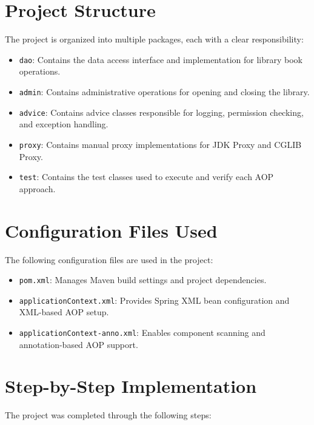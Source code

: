 \documentclass[12pt,a4paper]{article}
\begin{document}
\section*{Project Structure}
The project is organized into multiple packages, each with a clear responsibility:
\begin{itemize}
    \item \texttt{dao}: Contains the data access interface and implementation for library book operations.
    \item \texttt{admin}: Contains administrative operations for opening and closing the library.
    \item \texttt{advice}: Contains advice classes responsible for logging, permission checking, and exception handling.
    \item \texttt{proxy}: Contains manual proxy implementations for JDK Proxy and CGLIB Proxy.
    \item \texttt{test}: Contains the test classes used to execute and verify each AOP approach.
\end{itemize}

\section*{Configuration Files Used}
The following configuration files are used in the project:
\begin{itemize}
    \item \texttt{pom.xml}: Manages Maven build settings and project dependencies.
    \item \texttt{applicationContext.xml}: Provides Spring XML bean configuration and XML-based AOP setup.
    \item \texttt{applicationContext-anno.xml}: Enables component scanning and annotation-based AOP support.
\end{itemize}

\section*{Step-by-Step Implementation}
The project was completed through the following steps:
\end{document}
